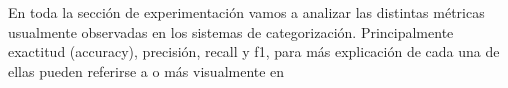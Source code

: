 En toda la sección de experimentación vamos a analizar las distintas métricas usualmente observadas en los sistemas de categorización. Principalmente exactitud (accuracy), precisión, recall y f1, para más explicación de cada una de ellas pueden referirse a \cite{metricasPaper} o más visualmente en \cite{metricasWeb}


\FloatBarrier
\newpage

\FloatBarrier
\newpage

\FloatBarrier
\newpage

